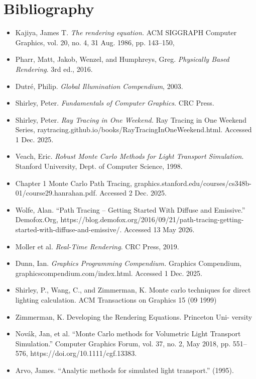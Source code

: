 \documentclass[12pt]{article}
\begin{document}
\newpage

\section{Bibliography}
\begin{itemize}
    
    \item Kajiya, James T. \textit{The rendering equation.} ACM SIGGRAPH Computer Graphics, vol. 20, no. 4, 31 Aug. 1986, pp. 143–150,
    \item Pharr, Matt, Jakob, Wenzel, and Humphreys, Greg. \textit{Physically Based Rendering}. 3rd ed., 2016.
    \item Dutré, Philip. \textit{Global Illumination Compendium}, 2003.
    \item Shirley, Peter. \textit{Fundamentals of Computer Graphics}. CRC Press.
    \item Shirley, Peter. \textit{Ray Tracing in One Weekend.} Ray Tracing in One Weekend Series, raytracing.github.io/books/RayTracingInOneWeekend.html. Accessed 1 Dec. 2025. 
    \item Veach, Eric. \textit{Robust Monte Carlo Methods for Light Transport Simulation}. Stanford University, Dept. of Computer Science, 1998. 
    \item Chapter 1 Monte Carlo Path Tracing, graphics.stanford.edu/courses/cs348b-01/course29.hanrahan.pdf. Accessed 2 Dec. 2025. 
    \item Wolfe, Alan. “Path Tracing – Getting Started With Diffuse and Emissive.” Demofox.Org, https://blog.demofox.org/2016/09/21/path-tracing-getting-started-with-diffuse-and-emissive/. Accessed 13 May 2026. 
    \item Moller et al. \textit{Real-Time Rendering}. CRC Press, 2019. 
    \item Dunn, Ian. \textit{Graphics Programming Compendium.} Graphics Compendium, graphicscompendium.com/index.html. Accessed 1 Dec. 2025. 
    \item Shirley, P., Wang, C., and Zimmerman, K. Monte carlo techniques
for direct lighting calculation. ACM Transactions on Graphics 15 (09
1999)
    \item Zimmerman, K. Developing the Rendering Equations. Princeton Uni-
versity
    \item Novák, Jan, et al. “Monte Carlo methods for Volumetric Light Transport Simulation.” Computer Graphics Forum, vol. 37, no. 2, May 2018, pp. 551–576, https://doi.org/10.1111/cgf.13383. 
    \item Arvo, James. “Analytic methods for simulated light transport.” (1995).
    
\end{itemize}
\end{document}
